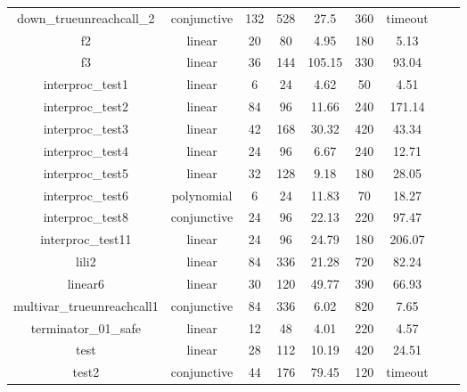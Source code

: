 \begin{table}[t]
\begin{tabular}{l c | c c c | c c | c c }
\multicolumn{1}{|c|}{down\_true\text{-}unreach\text{-}call\_2}         		&conjunctive 	&132 &528 &27.5  &360   &timeout  & &  \\
\multicolumn{1}{|c|}{f2}         											&linear 		&20 &80 &4.95  &180   &5.13  & &  \\
\multicolumn{1}{|c|}{f3}         											&linear 		&36 &144 &105.15  &330   &93.04  & &  \\
\multicolumn{1}{|c|}{interproc\_test1}         								&linear 		&6 &24 &4.62  &50   &4.51  & &  \\
\multicolumn{1}{|c|}{interproc\_test2}         								&linear 		&84 &96 &11.66  &240   &171.14  & &  \\
\multicolumn{1}{|c|}{interproc\_test3}         								&linear 		&42 &168 &30.32  &420   &43.34  & &  \\
\multicolumn{1}{|c|}{interproc\_test4}         								&linear 		&24 &96 &6.67  &240   &12.71  & &  \\
\multicolumn{1}{|c|}{interproc\_test5}         								&linear 		&32 &128 &9.18  &180   &28.05  & &  \\
\multicolumn{1}{|c|}{interproc\_test6}         								&polynomial 	&6 &24 &11.83  &70   &18.27  & &  \\
\multicolumn{1}{|c|}{interproc\_test8}         								&conjunctive 	&24 &96 &22.13  &220   &97.47  & &  \\
\multicolumn{1}{|c|}{interproc\_test11}         							&linear 		&24 &96 &24.79  &180   &206.07  & &  \\
\multicolumn{1}{|c|}{lili2}         										&linear 		&84 &336 &21.28  &720   &82.24  & &  \\
\multicolumn{1}{|c|}{linear6}         										&linear 		&30 &120 &49.77  &390  &66.93  & &  \\
\multicolumn{1}{|c|}{multivar\_true\text{-}unreach\text{-}call1}         	&conjunctive 	&84 &336 &6.02  &820   &7.65  & &  \\
\multicolumn{1}{|c|}{terminator\_01\_safe}         							&linear 		&12 &48 &4.01  &220   &4.57  & &  \\
\multicolumn{1}{|c|}{test}         											&linear 		&28 &112 &10.19  &420  &24.51  & &  \\
\multicolumn{1}{|c|}{test2}         										&conjunctive 	&44 &176 &79.45  &120   &timeout  & &  \\

\end{tabular}
\end{table}

